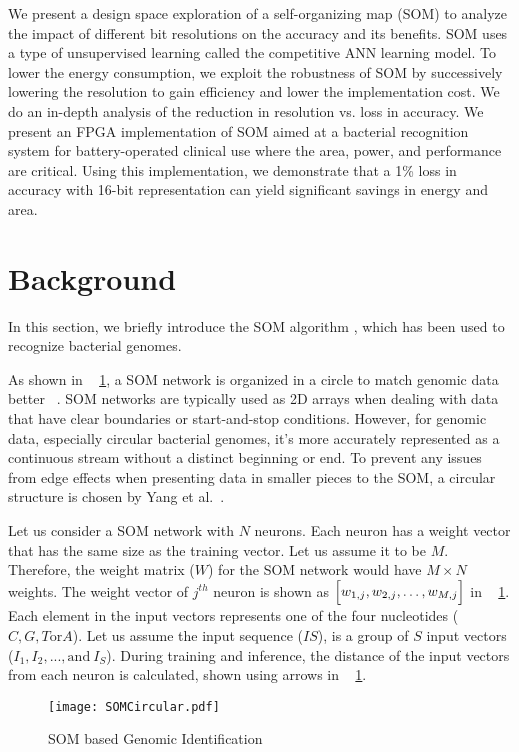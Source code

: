 We present a design space exploration of a self-organizing map (SOM) to analyze the impact of different bit resolutions on the accuracy and its benefits. SOM uses a type of unsupervised learning called the competitive ANN learning model. To lower the energy consumption, we exploit the robustness of SOM by successively lowering the resolution to gain efficiency and lower the implementation cost. We do an in-depth analysis of the reduction in resolution vs. loss in accuracy. We present an FPGA implementation of SOM aimed at a bacterial recognition system for battery-operated clinical use where the area, power, and performance are critical. Using this implementation, we demonstrate that a 1\% loss in accuracy with 16-bit representation can yield significant savings in energy and area.
\section{Background}
In this section, we briefly introduce the SOM algorithm \cite{Yang2018RiBoSOM}, which has been used to recognize bacterial genomes.

As shown in \figurename{~ \ref{fig:algorithm}}, a SOM network is organized in a circle to match genomic data better ~\cite{Yang2018RiBoSOM}. SOM networks are typically used as 2D arrays when dealing with data that have clear boundaries or start-and-stop conditions. However, for genomic data, especially circular bacterial genomes, it's more accurately represented as a continuous stream without a distinct beginning or end. To prevent any issues from edge effects when presenting data in smaller pieces to the SOM, a circular structure is chosen by Yang et al.~\cite{Yang2018RiBoSOM}. 

Let us consider a SOM network with $N$ neurons. Each neuron has a weight vector that has the same size as the training vector. Let us assume it to be $M$. Therefore, the weight matrix ($W$) for the SOM network would have $M{\times}N$ weights. The weight vector of $j^{th}$ neuron is shown as $\Bigl[ w_{1,j},w_{2,j},\ldots,w_{M,j}\Bigr]$ in \figurename{~ \ref{fig:algorithm}}. Each element in the input vectors represents one of the four nucleotides ($C,G,T \text{or} A$). Let us assume the input sequence ($IS$), is a group of $S$ input vectors ($I_1, I_2,...,\text{and}~I_S$). During training and inference, the distance of the input vectors from each neuron is calculated, shown using arrows in \figurename{~ \ref{fig:algorithm}}.
\begin{figure}[htb]
	\centerline{\texttt{[image: SOMCircular.pdf]}}
	\caption{SOM based Genomic Identification}
	\label{fig:algorithm}
\end{figure}

